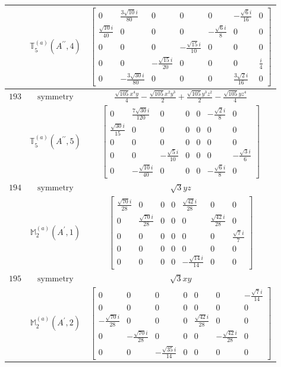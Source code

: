\documentclass[fleqn,8pt,landscape]{jsarticle}
\begin{document}
\begin{longtable}{ccc}
$  $ & $ \mathbb{T}_{5}^{(a)}(A^{\prime\prime},4) $ & $ \begin{bmatrix} 0 & \frac{3 \sqrt{10} i}{80} & 0 & 0 & 0 & - \frac{\sqrt{6} i}{16} & 0 \\ \frac{\sqrt{10} i}{40} & 0 & 0 & 0 & - \frac{\sqrt{6} i}{8} & 0 & 0 \\ 0 & 0 & 0 & - \frac{\sqrt{15} i}{10} & 0 & 0 & 0 \\ 0 & 0 & - \frac{\sqrt{15} i}{20} & 0 & 0 & 0 & \frac{i}{4} \\ 0 & - \frac{3 \sqrt{30} i}{80} & 0 & 0 & 0 & \frac{3 \sqrt{2} i}{16} & 0 \end{bmatrix} $ \\ \hline
$ 193 $ & $ \text{symmetry} $ & $ \frac{\sqrt{105} x^{4} y}{4} - \frac{\sqrt{105} x^{2} y^{3}}{2} + \frac{\sqrt{105} y^{3} z^{2}}{2} - \frac{\sqrt{105} y z^{4}}{4} $ \\
$  $ & $ \mathbb{T}_{5}^{(a)}(A^{\prime\prime},5) $ & $ \begin{bmatrix} 0 & \frac{7 \sqrt{30} i}{120} & 0 & 0 & 0 & - \frac{\sqrt{2} i}{8} & 0 \\ \frac{\sqrt{30} i}{15} & 0 & 0 & 0 & 0 & 0 & 0 \\ 0 & 0 & 0 & 0 & 0 & 0 & 0 \\ 0 & 0 & - \frac{\sqrt{5} i}{10} & 0 & 0 & 0 & - \frac{\sqrt{3} i}{6} \\ 0 & - \frac{\sqrt{10} i}{40} & 0 & 0 & 0 & - \frac{\sqrt{6} i}{8} & 0 \end{bmatrix} $ \\ \hline
$ 194 $ & $ \text{symmetry} $ & $ \sqrt{3} y z $ \\
$  $ & $ \mathbb{M}_{2}^{(a)}(A^{\prime},1) $ & $ \begin{bmatrix} \frac{\sqrt{70} i}{28} & 0 & 0 & 0 & \frac{\sqrt{42} i}{28} & 0 & 0 \\ 0 & \frac{\sqrt{70} i}{28} & 0 & 0 & 0 & \frac{\sqrt{42} i}{28} & 0 \\ 0 & 0 & 0 & 0 & 0 & 0 & \frac{\sqrt{7} i}{7} \\ 0 & 0 & 0 & 0 & 0 & 0 & 0 \\ 0 & 0 & 0 & 0 & - \frac{\sqrt{14} i}{14} & 0 & 0 \end{bmatrix} $ \\ \hline
$ 195 $ & $ \text{symmetry} $ & $ \sqrt{3} x y $ \\
$  $ & $ \mathbb{M}_{2}^{(a)}(A^{\prime},2) $ & $ \begin{bmatrix} 0 & 0 & 0 & 0 & 0 & 0 & - \frac{\sqrt{7} i}{14} \\ 0 & 0 & 0 & 0 & 0 & 0 & 0 \\ - \frac{\sqrt{70} i}{28} & 0 & 0 & 0 & \frac{\sqrt{42} i}{28} & 0 & 0 \\ 0 & - \frac{\sqrt{70} i}{28} & 0 & 0 & 0 & - \frac{\sqrt{42} i}{28} & 0 \\ 0 & 0 & - \frac{\sqrt{35} i}{14} & 0 & 0 & 0 & 0 \end{bmatrix} $ \\ \hline

\end{longtable}
\end{document}
